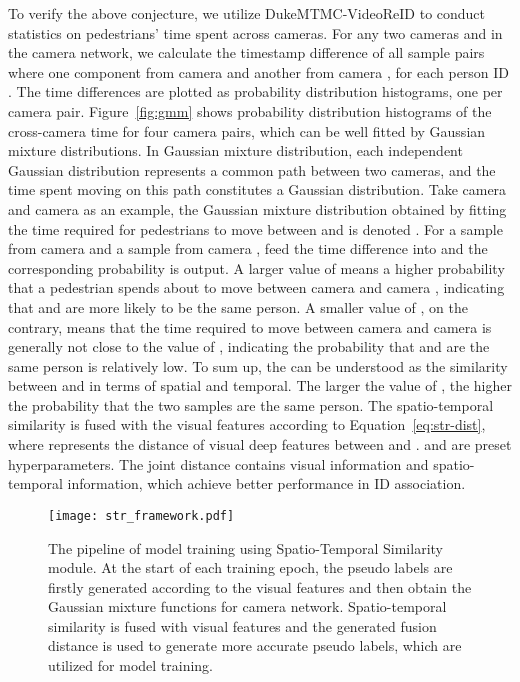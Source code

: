 \documentclass[10pt,twocolumn,letterpaper]{article}
\begin{document}
To verify the above conjecture, we utilize DukeMTMC-VideoReID to conduct statistics on pedestrians' time spent across cameras. For any two cameras  and  in the camera network, we calculate the timestamp difference  of all sample pairs  where one component from camera  and another from camera , for each person ID . The time differences are plotted as probability distribution histograms, one per camera pair. Figure~\ref{fig:gmm} shows probability distribution histograms of the cross-camera time for four camera pairs, which can be well fitted by Gaussian mixture distributions. In Gaussian mixture distribution, each independent Gaussian distribution represents a common path between two cameras, and the time spent moving on this path constitutes a Gaussian distribution. Take camera  and camera  as an example, the Gaussian mixture distribution obtained by fitting the time required for pedestrians to move between  and  is denoted . For a sample  from camera  and a sample  from camera , feed the time difference  into  and the corresponding probability  is output. A larger value of  means a higher probability that a pedestrian spends about  to move between camera  and camera , indicating that  and  are more likely to be the same person. A smaller value of , on the contrary, means that the time required to move between camera  and camera  is generally not close to the value of , indicating the probability that  and  are the same person is relatively low. To sum up, the  can be understood as the similarity between  and  in terms of spatial and temporal. The larger the value of , the higher the probability that the two samples are the same person. The spatio-temporal similarity  is fused with the visual features according to Equation~\ref{eq:str-dist}, where  represents the distance of visual deep features between  and .  and  are preset hyperparameters. The joint distance  contains visual information and spatio-temporal information, which achieve better performance in ID association.



\begin{figure*}
    \centering
    \texttt{[image: str\_framework.pdf]}
    \caption{The pipeline of model training using Spatio-Temporal Similarity module. At the start of each training epoch, the pseudo labels are firstly generated according to the visual features and then obtain the Gaussian mixture functions for camera network. Spatio-temporal similarity is fused with visual features and the generated fusion distance is used to generate more accurate pseudo labels, which are utilized for model training.}
    \label{fig:str_framework}
\end{figure*}
\end{document}
